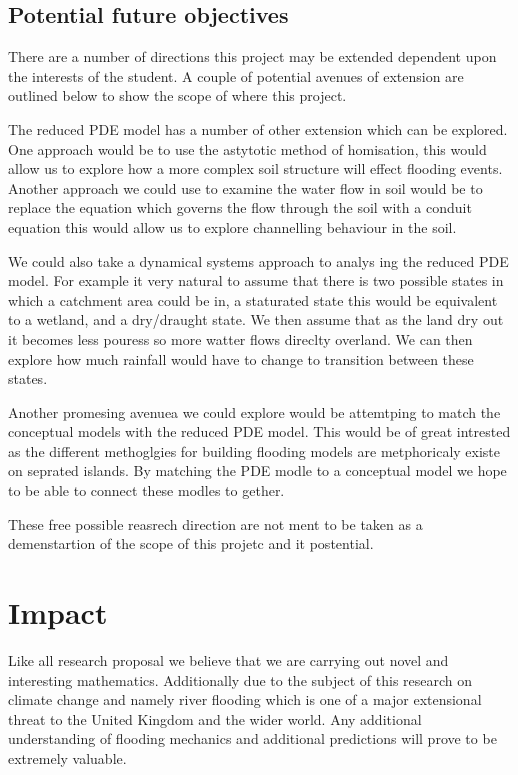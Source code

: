\documentclass[11pt]{article}
\begin{document}
\subsection{Potential future objectives}

There are a number of directions this project may be extended dependent upon the interests of the student. A couple of potential avenues of extension are outlined below to show the scope of where this project.

The reduced PDE model has a number of other extension which can be explored. One approach would be to use the astytotic method of homisation, this would allow us to explore how a more complex soil structure will effect flooding events. Another approach we could use to examine the water flow in soil would be to replace the equation which governs the flow through the soil with a conduit equation this would allow us to explore channelling behaviour in the soil.

We could also take a dynamical systems approach to analys ing the reduced PDE model. For example it very natural to assume that there is two possible states in which a catchment area could be in, a staturated state this would be equivalent to a wetland, and a dry/draught state. We then assume that as the land dry out it becomes less pouress so more watter flows direclty overland. We can then explore how much rainfall would have to change to transition between these states.

Another promesing avenuea we could explore would be attemtping to match the conceptual models with the reduced PDE model. This would be of great intrested as the different methoglgies for building flooding models are metphoricaly existe on seprated islands. By matching the PDE modle to a conceptual model we hope to be able to connect these modles to gether.

These free possible reasrech direction are not ment to be taken as a demenstartion of the scope of this projetc and it postential.



\section{Impact}
Like all research proposal we believe that we are carrying out novel and interesting mathematics. Additionally due to the subject of this research on climate change and namely river flooding which is one of a major extensional threat to the United Kingdom and the wider world. Any additional understanding of flooding mechanics and additional predictions will prove to be extremely valuable.
\end{document}
